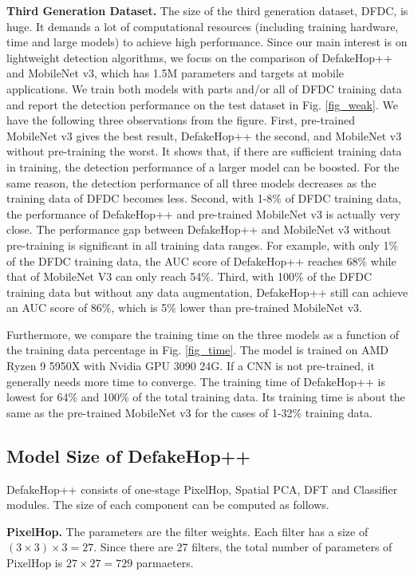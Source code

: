 \documentclass[main, biber]{now-journal}
\begin{document}
{\bf Third Generation Dataset.} The size of the third generation
dataset, DFDC, is huge. It demands a lot of computational resources
(including training hardware, time and large models) to achieve high
performance.  Since our main interest is on lightweight detection
algorithms, we focus on the comparison of DefakeHop++ and MobileNet v3,
which has 1.5M parameters and targets at mobile applications.  We train
both models with parts and/or all of DFDC training data and report the
detection performance on the test dataset in Fig.  \ref{fig_weak}.  We
have the following three observations from the figure. First,
pre-trained MobileNet v3 gives the best result, DefakeHop++ the second,
and MobileNet v3 without pre-training the worst. It shows that, if there
are sufficient training data in training, the detection performance of a
larger model can be boosted. For the same reason, the detection
performance of all three models decreases as the training data of DFDC
becomes less. Second, with 1-8\% of DFDC training data, the performance
of DefakeHop++ and pre-trained MobileNet v3 is actually very close. The
performance gap between DefakeHop++ and MobileNet v3 without
pre-training is significant in all training data ranges. For example,
with only 1\% of the DFDC training data, the AUC score of DefakeHop++
reaches 68\% while that of MobileNet V3 can only reach 54\%. Third, with
100\% of the DFDC training data but without any data augmentation,
DefakeHop++ still can achieve an AUC score of 86\%, which is 5\% lower
than pre-trained MobileNet v3. 

Furthermore, we compare the training time on the three models as a
function of the training data percentage in Fig.  \ref{fig_time}.  The
model is trained on AMD Ryzen 9 5950X with Nvidia GPU 3090
24G.  If a CNN is not pre-trained, it generally needs more time to
converge.  The training time of DefakeHop++ is lowest for 64\% and 100\%
of the total training data. Its training time is about the same as the
pre-trained MobileNet v3 for the cases of 1-32\% training data. 

\subsection{Model Size of DefakeHop++} 

DefakeHop++ consists of one-stage PixelHop, Spatial PCA, DFT and
Classifier modules. The size of each component can be computed as
follows. 

{\bf PixelHop.} The parameters are the filter weights. Each filter
has a size of $(3 \times 3) \times 3 =27$. Since there are 27 filters, the
total number of parameters of PixelHop is $27\times 27=729$ parmaeters. 
\end{document}

